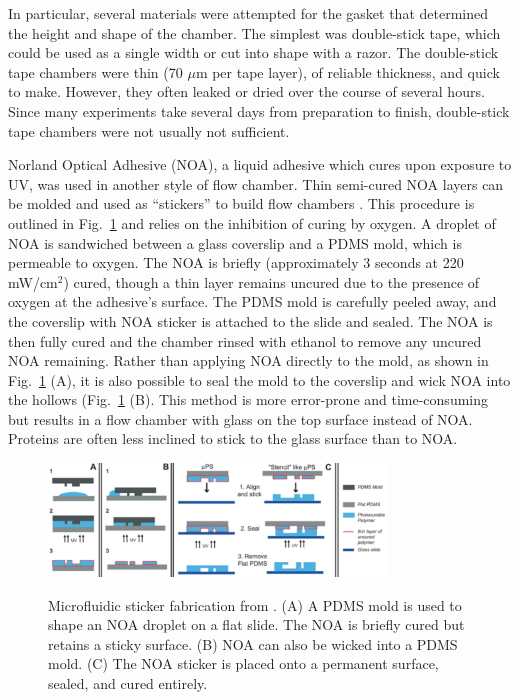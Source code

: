 In particular, several materials were attempted for the gasket that determined the height and shape of the chamber.  The simplest was double-stick tape, which could be used as a single width or cut into shape with a razor.  The double-stick tape chambers were thin (70 $\mu$m per tape layer), of reliable thickness, and quick to make.  However, they often leaked or dried over the course of several hours.  Since many experiments take several days from preparation to finish, double-stick tape chambers were not usually not sufficient.

Norland Optical Adhesive (NOA), a liquid adhesive which cures upon exposure to UV, was used in another style of flow chamber.  Thin semi-cured NOA layers can be molded and used as ``stickers'' to build flow chambers \cite{bartolo08, paustian13}.  This procedure is outlined in Fig.~\ref{fig:stickers} and relies on the inhibition of curing by oxygen.  A droplet of NOA is sandwiched between a glass coverslip and a PDMS mold, which is permeable to oxygen. The NOA is briefly (approximately 3 seconds at 220 mW/cm$^2$) cured, though a thin layer remains uncured due to the presence of oxygen at the adhesive's surface. The PDMS mold is carefully peeled away, and the coverslip with NOA sticker is attached to the slide and sealed.  The NOA is then fully cured and the chamber rinsed with ethanol to remove any uncured NOA remaining. Rather than applying NOA directly to the mold, as shown in Fig.~\ref{fig:stickers} (A), it is also possible to seal the mold to the coverslip and wick NOA into the hollows (Fig.~\ref{fig:stickers} (B).  This method is more error-prone and time-consuming but results in a flow chamber with glass on the top surface instead of NOA.  Proteins are often less inclined to stick to the glass surface than to NOA.

\begin{figure}
\caption[Microfluidic sticker fabrication.]{Microfluidic sticker fabrication from \cite{bartolo08}. (A) A PDMS mold is used to shape an NOA droplet on a flat slide.  The NOA is briefly cured but retains a sticky surface.  (B) NOA can also be wicked into a PDMS mold. (C) The NOA sticker is placed onto a permanent surface, sealed, and cured entirely.}
\centering
\includegraphics[width=0.8\textwidth]{figs/ch03/sticker-bartolo.pdf}
\label{fig:stickers}
\end{figure}

